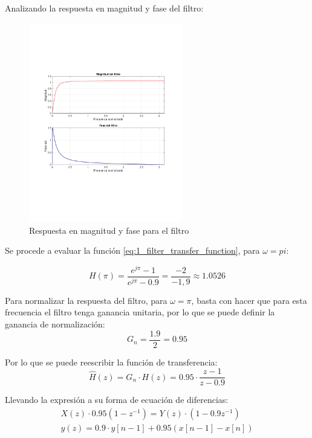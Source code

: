 		Analizando la respuesta en magnitud y fase del filtro:
		\begin{figure}[H]
			\center
			\includegraphics[width=0.6\textwidth,clip, trim = {1.9cm 6.8cm 2.3cm 7cm}]{../plots/1_mag_phase.pdf}
			\caption{Respuesta en magnitud y fase para el filtro}
		\end{figure}
		
		Se procede a evaluar la función \ref{eq:1_filter_transfer_function}, para $\omega = pi$:
		
		\begin{equation}
			H(\pi) = \frac{e^{j\pi} - 1}{e^{j\pi} - 0.9} = \frac{-2}{-1,9} \approx 1.0526
			\label{eq:1_filter_pi}
		\end{equation}
		
		Para normalizar la respuesta del filtro, para $\omega = \pi$, basta con hacer que para esta frecuencia el filtro tenga ganancia unitaria, por lo que se puede definir la ganancia de normalización:
		\begin{equation}
			G_{n} = \frac{1.9}{2} = 0.95
		\end{equation}
		
		Por lo que se puede reescribir la función de transferencia:
		\begin{equation}
			\hat{H}(z) = G_{n} \cdot H(z) = 0.95 \cdot \frac{z - 1}{z -0.9} 
			\label{eq:1_transfer_function_normal}
		\end{equation}
		
		Llevando la expresión a su forma de ecuación de diferencias:
		\begin{align}
			X(z) \cdot 0.95 ( 1 - z^{-1} ) = Y(z) \cdot (1 - 0.9 z^{-1}) \\
			y(z) = 0.9 \cdot y\left[ n - 1 \right] + 0.95 \left( x\left[ n - 1 \right] - x\left[n \right] \right)
		\end{align}
		
